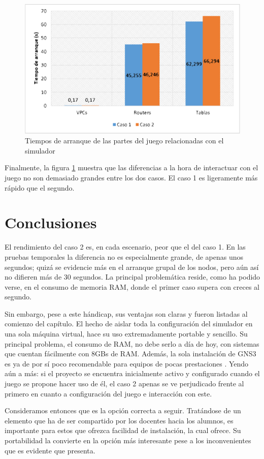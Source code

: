 \begin{figure}[H]
  \centering
  \includegraphics[scale=0.4]{imagenes/arranquejuego}
  \caption{Tiempos de arranque de las partes del juego relacionadas con el simulador}
  \label{fig:arranquejuego}
\end{figure}

Finalmente, la figura \ref{fig:arranquejuego} muestra que las diferencias a la hora de interactuar con el juego no son demasiado grandes entre los dos casos. El caso 1 es ligeramente más rápido que el segundo.

\section{Conclusiones}
El rendimiento del caso 2 es, en cada escenario, peor que el del caso 1. En las pruebas temporales la diferencia no es especialmente grande, de apenas unos segundos; quizá se evidencie más en el arranque grupal de los nodos, pero aún así no difieren más de 30 segundos. La principal problemática reside, como ha podido verse, en el consumo de memoria RAM, donde el primer caso supera con creces al segundo. 

Sin embargo, pese a este hándicap, sus ventajas son claras y fueron listadas al comienzo del capítulo. El hecho de aislar toda la configuración del simulador en una sola máquina virtual, hace su uso extremadamente portable y sencillo. Su principal problema, el consumo de RAM, no debe serlo a día de hoy, con sistemas que cuentan fácilmente con 8GBs de RAM. Además, la sola instalación de GNS3 es ya de por sí poco recomendable para equipos de pocas prestaciones \cite{gnsweb}. Yendo aún a más: si el proyecto se encuentra inicialmente activo y configurado cuando el juego se propone hacer uso de él, el caso 2 apenas se ve perjudicado frente al primero en cuanto a configuración del juego e interacción con este.

Consideramos entonces que es la opción correcta a seguir. Tratándose de un elemento que ha de ser compartido por los docentes hacia los alumnos, es importante para estos que ofrezca facilidad de instalación, la cual ofrece. Su portabilidad la convierte en la opción más interesante pese a los inconvenientes que es evidente que presenta.
